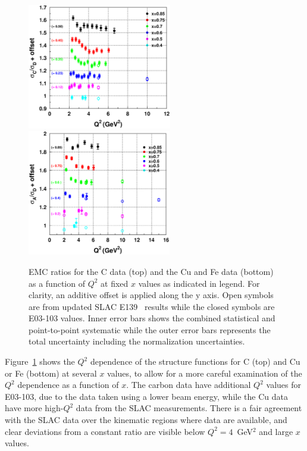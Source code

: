 \begin{figure}[htbp]
\includegraphics[width=.44\textwidth,height=55mm]{plots/compare_slac_c_q2dep.eps} \\
\includegraphics[width=.44\textwidth,height=55mm]{plots/compare_slac_cu_q2dep.eps}
\caption{EMC ratios for the C data (top) and the Cu and Fe data (bottom) as a
function of $Q^2$ at fixed $x$ values as indicated in legend. For clarity, an
additive offset is applied along the y axis. Open symbols are from updated
SLAC E139~\cite{slace139} results while the closed symbols are E03-103 values.
Inner error bars shows the combined statistical and point-to-point systematic
while the outer error bars represents the total uncertainty including the
normalization uncertainties.
\label{emc_q2_c_fixed_x_fig}}
\end{figure}



Figure~\ref{emc_q2_c_fixed_x_fig} shows the $Q^2$ dependence of the structure
functions for C (top) and Cu or Fe (bottom) at several $x$ values, to allow
for a more careful examination of the $Q^2$ dependence as a function of $x$. 
The carbon data have additional $Q^2$ values for E03-103, due to the data
taken using a lower beam energy, while the Cu data have more high-$Q^2$
data from the SLAC measurements. There is a fair agreement with the SLAC data
over the kinematic regions where data are available, and clear deviations from
a constant ratio are visible below $Q^2=4$~GeV$^2$ and large $x$ values.

